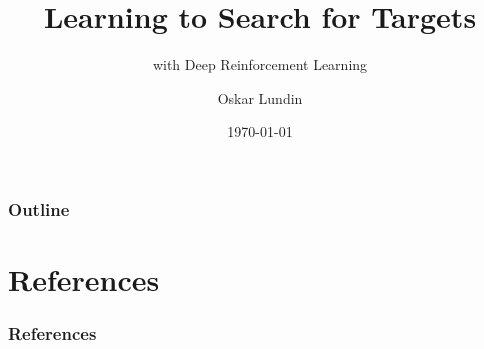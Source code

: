 \documentclass[handout,aspectratio=169]{beamer}
\title{Learning to Search for Targets}
\subtitle{with Deep Reinforcement Learning}
\author{Oskar Lundin}
\institute{Linköping University}
\date{\today}
\begin{document}
\begin{frame}
    \titlepage
\end{frame}

\begin{frame}
    \frametitle{Outline}
    \tableofcontents
\end{frame}







\section*{References}

\begin{frame}
    \frametitle{References}
    
    
\end{frame}

\appendix


\end{document}
